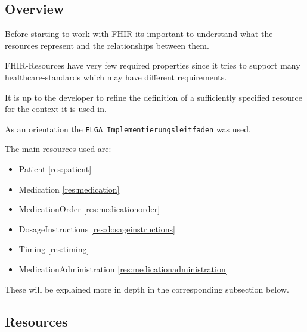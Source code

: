 \documentclass{article}
\begin{document}
\subsection{Overview}\label{overview}
Before starting to work with FHIR its important to understand what the resources represent and the relationships between them.

FHIR-Resources have very few required properties since it tries to
support many healthcare-standards which may have different requirements.

It is up to the developer to refine the definition of a sufficiently
specified resource for the context it is used in.

As an orientation the \texttt{ELGA\ Implementierungsleitfaden} was used.

The main resources used are:
\begin{itemize}
\item
  Patient \ref{res:patient}
\item
  Medication \ref{res:medication}
\item
  MedicationOrder \ref{res:medicationorder}
\item
  DosageInstructions \ref{res:dosageinstructions}
\item
  Timing \ref{res:timing}
\item
  MedicationAdministration \ref{res:medicationadministration}
\end{itemize}

These will be explained more in depth in the corresponding
subsection below.

\subsection{Resources}\label{step3}
\end{document}
